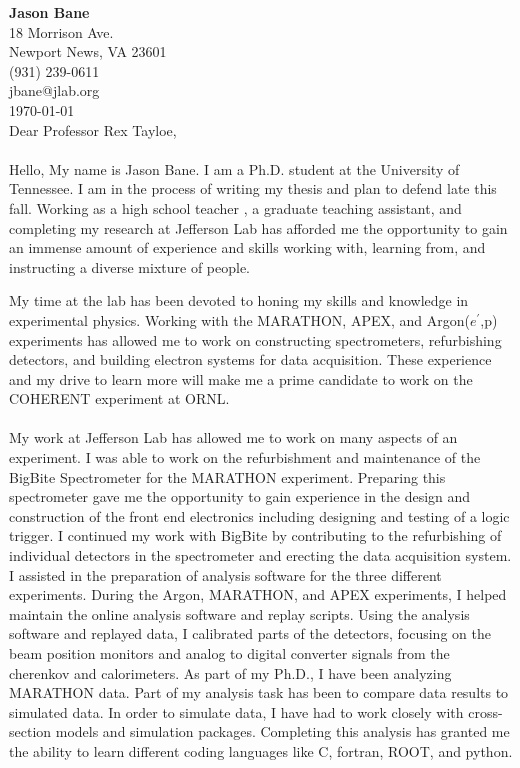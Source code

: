 \documentclass[12pt,letterpaper]{article}
\newcommand{\CPP}
{C\nolinebreak[4]\hspace{-.05em}\raisebox{.22ex}{\footnotesize\bf ++}}
\begin{document}
\vspace*{-1.2cm}
{\textbf{Jason Bane}}\\
18 Morrison Ave. \\
Newport News, VA 23601 \\
(931) 239-0611 \\
jbane@jlab.org \\
\today\\

Dear Professor Rex Tayloe, 

\paragraph{}Hello, My name is Jason Bane. I am a Ph.D. student at the University of Tennessee. I am in the process of writing my thesis and plan to defend late this fall. Working as a high school teacher , a graduate teaching assistant, and completing my research at Jefferson Lab has afforded me the opportunity to gain an immense amount of experience and skills working with, learning from, and instructing a diverse mixture of people.

My time at the lab has been devoted to honing my skills and knowledge in experimental physics. Working with the MARATHON, APEX, and Argon($e^\prime$,p) experiments has allowed me to work on constructing spectrometers, refurbishing detectors, and building electron systems for data acquisition. These experience and my drive to learn more will make me a prime candidate to work on the COHERENT experiment at ORNL.
\paragraph{}My work at Jefferson Lab has allowed me to work on many aspects of an experiment. I was able to work on the refurbishment and maintenance of the BigBite Spectrometer for the MARATHON experiment. Preparing this spectrometer gave me the opportunity to gain experience in the design and construction of the front end electronics including designing and testing of a logic trigger. I continued my work with BigBite by contributing to the refurbishing of individual detectors in the spectrometer and erecting the data acquisition system. I assisted in the preparation of analysis software for the three different experiments. During the Argon, MARATHON, and APEX experiments, I helped maintain the online analysis software and replay scripts. Using the analysis software and replayed data, I calibrated parts of the detectors, focusing on the beam position monitors and analog to digital converter signals from the cherenkov and calorimeters. As part of my Ph.D., I have been analyzing MARATHON data. Part of my analysis task has been to compare data results to simulated data. In order to simulate data, I have had to work closely with cross-section models and simulation packages. Completing this analysis has granted me the ability to learn different coding languages like \CPP, fortran, ROOT, and python.
\end{document}
